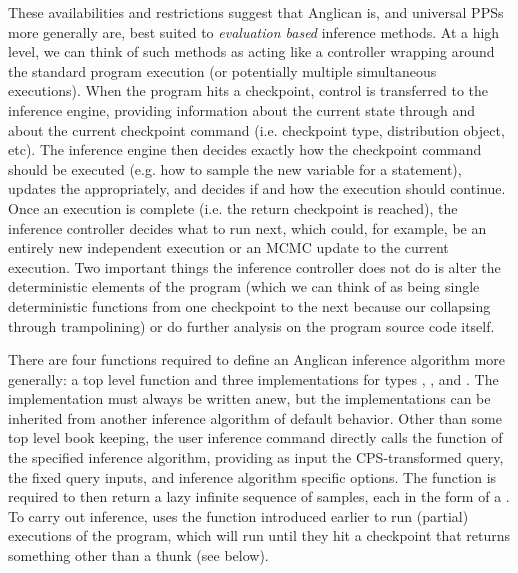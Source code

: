 These availabilities and restrictions suggest that Anglican is, and universal PPSs more generally are,
best suited to \emph{evaluation based} inference methods.  At a high level, we can think of such methods
as acting like a controller wrapping around the standard program
execution (or potentially multiple simultaneous executions).  When the program hits a checkpoint,
control is transferred to the inference engine, providing information about the current state through
\angstate and about the current checkpoint command (i.e. checkpoint type, distribution object, etc).
The inference engine then decides exactly how the checkpoint command should be executed (e.g. how to
sample the new variable for a \sample statement), updates the \angstate appropriately, and decides if
and how the execution should continue.  Once an execution is complete (i.e. the return checkpoint
is reached), the inference controller decides what to run next, which could, for example, be an entirely new independent
execution or an MCMC update to the current execution.  Two important things the inference controller
does not do is alter the deterministic elements of the program (which we can think of as being single
deterministic functions from one checkpoint to the next because our collapsing through trampolining)
or do further analysis on the program source code itself.  

There are four functions required to define an Anglican inference algorithm more generally: a top level 
\anginfer function and three \checkpoint implementations
for types , , and  .  The \anginfer
implementation must always be written anew, but the \checkpoint implementations can be inherited from
another inference algorithm of default behavior.  Other than some top level book keeping, the user
inference command \doquery directly calls the \anginfer function of the specified inference algorithm, providing
as input the CPS-transformed query, the fixed query inputs, and inference algorithm specific options.
The \anginfer function is required to then return a lazy infinite sequence of samples, each in the form of
a \angstate.  To carry out inference, \anginfer uses the  function introduced earlier
to run (partial) executions of the program, which will run until they hit a checkpoint that returns something
other than a thunk (see below).  

